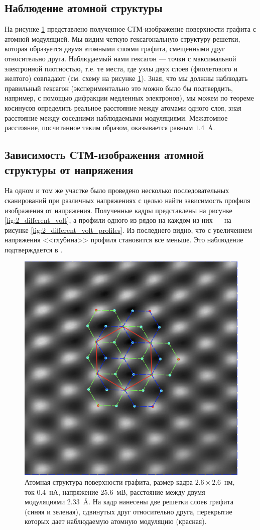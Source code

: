 \documentclass[a4paper, 12pt]{article}
\begin{document}
	\subsection{Наблюдение атомной структуры}
	
	На рисунке \ref{fig:2_atomic} представлено полученное СТМ-изображение поверхности графита с атомной модуляцией. Мы видим четкую гексагональную структуру решетки, которая образуется двумя атомными слоями графита, смещенными друг относительно друга. Наблюдаемый нами гексагон --- точки с максимальной электронной плотностью, т.е. те места, где узлы двух слоев (фиолетового и желтого) совпадают (см. схему на рисунке \ref{fig:2_atomic}). Зная, что мы должны наблюдать правильный гексагон (экспериментально это можно было бы подтвердить, например, с помощью дифракции медленных электронов), мы можем по теореме косинусов определить реальное расстояние между атомами одного слоя, зная расстояние между соседними наблюдаемыми модуляциями. Межатомное расстояние, посчитанное таким образом, оказывается равным $1.4$~\AA. 
	
	\subsection{Зависимость СТМ-изображения атомной структуры от напряжения}
	
	На одном и том же участке было проведено несколько последовательных сканирований при различных напряжениях с целью найти зависимость профиля изображения от напряжения. Полученные кадры представлены на рисунке \ref{fig:2_different_volt}, а профили одного из рядов на каждом из них --- на рисунке \ref{fig:2_different_volt_profiles}. Из последнего видно, что с увеличением напряжения <<глубина>> профиля становится все меньше. Это наблюдение подтверждается в \cite{STM_Binnig}.
	
	\begin{figure}[H]
		\centering
		\includegraphics[width=0.6\linewidth]{Crystal_structure}
		\caption{Атомная структура поверхности графита, размер кадра $2.6\times2.6$~нм, ток $0.4$~нА, напряжение 25.6~мВ, расстояние между двумя модуляциями 2.33~\AA. На кадр нанесены две решетки слоев графита (синяя и зеленая), сдвинутых друг относительно друга, перекрытие которых дает наблюдаемую атомную модуляцию (красная).}
		\label{fig:2_atomic}
	\end{figure}
	
\end{document}
